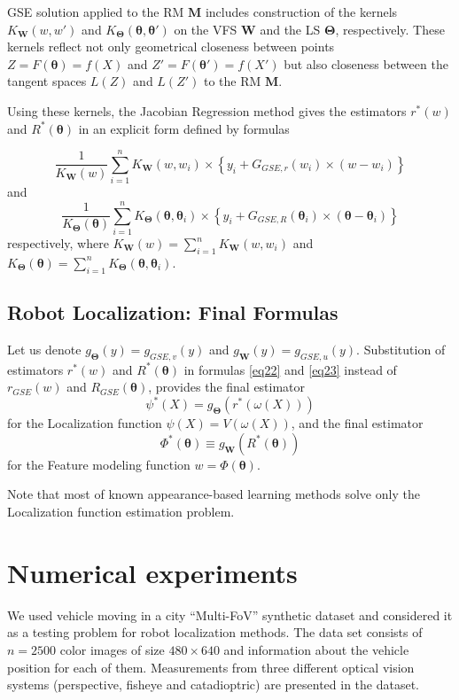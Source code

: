 \documentclass[conference]{IEEEtran} %
\def\mbW{\mathbf{W}}
\def\mbTheta{{\bm\Theta}}
\def\mbtheta{{\bm\theta}}
\def\mbM{\mathbf{M}}
\begin{document}
GSE solution applied to the RM $\mbM$ includes construction of the kernels $K_{\mathbf{W}}(w, w')$ and $K_{\mbTheta}(\mbtheta, \mbtheta')$ on the VFS $\mbW$ and the LS $\mbTheta$, respectively. These kernels reflect not only geometrical closeness between points $Z = F(\mbtheta) = f(X)$ and $Z' = F(\mbtheta') = f(X')$ but also closeness between the tangent spaces $L(Z)$ and $L(Z')$ to the RM $\mbM$.

Using these kernels, the Jacobian Regression method gives the estimators $r^*(w)$ and $R^*(\mbtheta)$ in an explicit form defined by formulas

\[
	\frac{1}{K_{\mathbf{W}}(w)} \sum_{i=1}^n K_{\mathbf{W}}(w,w_i)\times\left\{y_i+G_{GSE,r}(w_i)\times(w-w_i)\right\}
\]
and
\[
	\frac{1}{K_{\mbTheta}(\mbtheta)} \sum_{i=1}^n K_{\mbTheta}(\mbtheta, \mbtheta_i)\times\left\{y_i+G_{GSE,R}(\mbtheta_i)\times(\mbtheta-\mbtheta_i)\right\}
\]
respectively, where
$K_{\mathbf{W}}(w) = \sum_{i=1}^n K_{\mathbf{W}}(w,w_i)$ and
$K_\mbTheta(\mbtheta) = \sum_{i=1}^n K_{\mbTheta}(\mbtheta,\mbtheta_i)$.

\subsection{Robot Localization: Final Formulas}

Let us denote $g_{\mbTheta}(y) = g_{GSE,v}(y)$ and $g_{\mathbf{W}}(y) = g_{GSE,u}(y)$. Substitution of estimators $r^*(w)$ and $R^*(\mbtheta)$ in formulas \eqref{eq22} and \eqref{eq23} instead of $r_{GSE}(w)$ and $R_{GSE}(\mbtheta)$, provides the final estimator
\[
	\psi^*(X) = g_{\mbTheta}(r^*(\omega(X)))
\]
for the Localization function $\psi(X) = V(\omega(X))$, and the final estimator
\[
	\Phi^*(\mbtheta) \equiv g_{\mathbf{W}}(R^*(\mbtheta))
\]
for the Feature modeling function $w = \Phi(\mbtheta)$.

Note that most of known appearance-based learning methods solve only the Localization function estimation problem.

\section{Numerical experiments}
\label{sec5}

We used vehicle moving in a city ``Multi-FoV'' synthetic dataset \cite{Zhang2016} and considered it as a testing problem for robot localization methods. The data set consists of $n = 2500$ color images of size $480 \times 640$ and information about the vehicle position for each of them. Measurements from three different optical vision systems (perspective, fisheye and catadioptric) are presented in the dataset.
\end{document}

